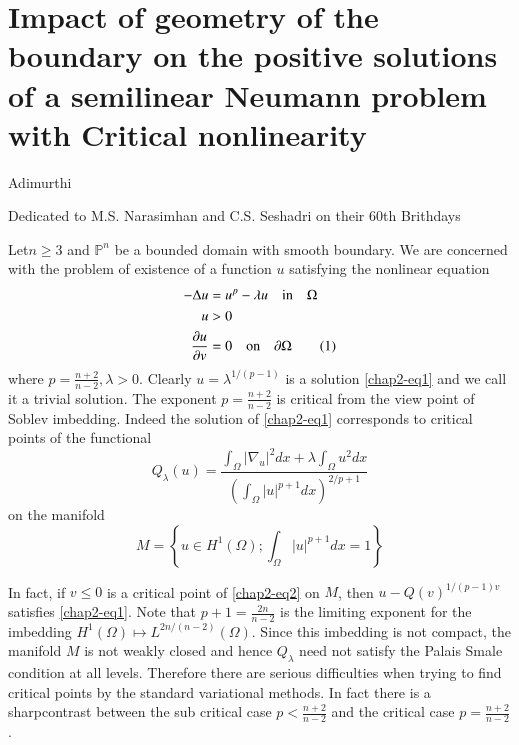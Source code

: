 \chapter{Impact of geometry of the boundary on the positive solutions of a semilinear Neumann problem with Critical nonlinearity}\label{chap2}

\begin{center}
Adimurthi

\medskip
Dedicated to M.S. Narasimhan and C.S. Seshadri on their 60th Brithdays
\end{center}


Let\pageoriginale $n\geq3$ and $\mathbb{P}^{n}$ be a bounded domain with smooth boundary. We are concerned with the problem
of existence of a function $u$ satisfying the nonlinear equation
\begin{align*}
-\Delta u &= u^{p}-\lambda u \quad{\rm in}\quad \Omega \nonumber\\
u &> 0 \nonumber\\
\dfrac{\partial u}{\partial v} &= 0 \quad {\rm on}\quad \partial \Omega\tag{1} \label{chap2-eq1} 
\end{align*}
where $p=\frac{n+2}{n-2},\lambda > 0$. Clearly $u=\lambda^{1/(p-1)}$ is a solution \eqref{chap2-eq1} and we call it a trivial solution. The exponent $p=\frac{n+2}{n-2}$ is critical from the view point of Soblev imbedding. Indeed the solution of \eqref{chap2-eq1} corresponds to critical points of the functional
\begin{equation*}
Q_{\lambda}(u) = \dfrac{\int_{\Omega}|\nabla_{u}|^{2}dx + \lambda\int_{\Omega}u^{2}dx}{\left(\int_{\Omega}|u|^{p+1}dx\right)^{2/p+1}}\tag{2}\label{chap2-eq2}
\end{equation*}
on the manifold
\begin{equation*}
M =\left\{u\in H^{1} (\Omega) ; \int_{\Omega}|u|^{p+1}dx=1\right\}\tag{3}\label{chap2-eq3}
\end{equation*}

In fact, if $v\leq 0$ is a critical point of \eqref{chap2-eq2} on $M$, then $u-Q(v)^{1/(p-1)v}$ satisfies \eqref{chap2-eq1}. Note that $p+1 =\frac{2n}{n-2}$ is the limiting exponent for the imbedding $H^{1}(\Omega)\mapsto L^{2n/(n-2)}(\Omega)$. Since this imbedding is not compact, the manifold $M$ is not weakly closed and hence $Q_{\lambda}$ need not satisfy the Palais Smale condition at all levels. Therefore there are serious difficulties when trying to find critical points by the standard variational methods. In fact there is a sharp\pageoriginale contrast between the sub critical case $p<\frac{n+2}{n-2}$ and the critical case $p=\frac{n+2}{n-2}$.
  
